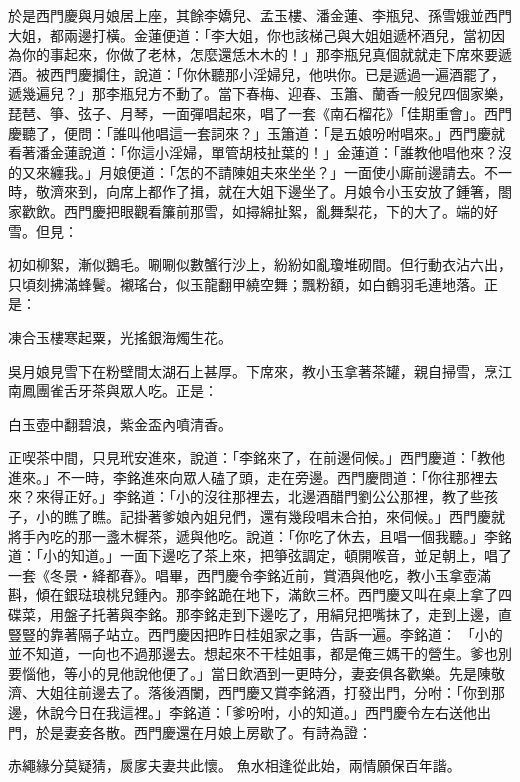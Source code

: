 \begin{showcontents}{}
於是西門慶與月娘居上座，其餘李嬌兒、孟玉樓、潘金蓮、李瓶兒、孫雪娥並西門大姐，都兩邊打橫。金蓮便道：「李大姐，你也該梯己與大姐姐遞杯酒兒，當初因為你的事起來，你做了老林，怎麼還恁木木的！」那李瓶兒真個就就走下席來要遞酒。被西門慶攔住，說道：「你休聽那小淫婦兒，他哄你。已是遞過一遍酒罷了，遞幾遍兒？」那李瓶兒方不動了。當下春梅、迎春、玉簫、蘭香一般兒四個家樂，琵琶、箏、弦子、月琴，一面彈唱起來，唱了一套《南石榴花》「佳期重會」。西門慶聽了，便問：「誰叫他唱這一套詞來？」玉簫道：「是五娘吩咐唱來。」西門慶就看著潘金蓮說道：「你這小淫婦，單管胡枝扯葉的！」金蓮道：「誰教他唱他來？沒的又來纏我。」月娘便道：「怎的不請陳姐夫來坐坐？」一面使小廝前邊請去。不一時，敬濟來到，向席上都作了揖，就在大姐下邊坐了。月娘令小玉安放了鍾箸，閤家歡飲。西門慶把眼觀看簾前那雪，如撏綿扯絮，亂舞梨花，下的大了。端的好雪。但見：

初如柳絮，漸似鵝毛。唰唰似數蟹行沙上，紛紛如亂瓊堆砌間。但行動衣沾六出，只頃刻拂滿蜂鬢。襯瑤台，似玉龍翻甲繞空舞；飄粉額，如白鶴羽毛連地落。正是：

凍合玉樓寒起粟，光搖銀海燭生花。

吳月娘見雪下在粉壁間太湖石上甚厚。下席來，教小玉拿著茶罐，親自掃雪，烹江南鳳團雀舌牙茶與眾人吃。正是：

白玉壺中翻碧浪，紫金盃內噴清香。

正喫茶中間，只見玳安進來，說道：「李銘來了，在前邊伺候。」西門慶道：「教他進來。」不一時，李銘進來向眾人磕了頭，走在旁邊。西門慶問道：「你往那裡去來？來得正好。」李銘道：「小的沒往那裡去，北邊酒醋門劉公公那裡，教了些孩子，小的瞧了瞧。記掛著爹娘內姐兒們，還有幾段唱未合拍，來伺候。」西門慶就將手內吃的那一盞木樨茶，遞與他吃。說道：「你吃了休去，且唱一個我聽。」李銘道：「小的知道。」一面下邊吃了茶上來，把箏弦調定，頓開喉音，並足朝上，唱了一套《冬景‧絳都春》。唱畢，西門慶令李銘近前，賞酒與他吃，教小玉拿壺滿斟，傾在銀琺琅桃兒鍾內。那李銘跪在地下，滿飲三杯。西門慶又叫在桌上拿了四碟菜，用盤子托著與李銘。那李銘走到下邊吃了，用絹兒把嘴抹了，走到上邊，直豎豎的靠著隔子站立。西門慶因把昨日桂姐家之事，告訴一遍。李銘道： 「小的並不知道，一向也不過那邊去。想起來不干桂姐事，都是俺三媽干的營生。爹也別要惱他，等小的見他說他便了。」當日飲酒到一更時分，妻妾俱各歡樂。先是陳敬濟、大姐往前邊去了。落後酒闌，西門慶又賞李銘酒，打發出門，分咐：「你到那邊，休說今日在我這裡。」李銘道：「爹吩咐，小的知道。」西門慶令左右送他出門，於是妻妾各散。西門慶還在月娘上房歇了。有詩為證：

赤繩緣分莫疑猜，扊扅夫妻共此懷。
魚水相逢從此始，兩情願保百年諧。


\end{showcontents}
